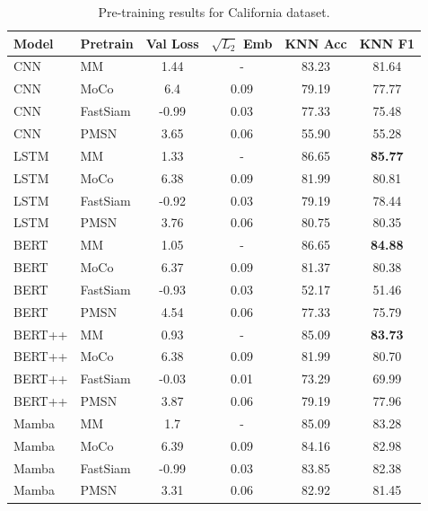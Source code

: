 \begin{table}[ht!]
    \centering
    \caption{Pre-training results for California dataset.}
    \begin{tabular}{llcccc}
        \toprule
        Model & Pretrain & Val Loss & $\sqrt{L_2}$ Emb & KNN Acc & KNN F1 \\
        \midrule
        CNN & MM & 1.44 & - & 83.23 & 81.64 \\
        CNN & MoCo & 6.4 & 0.09 & 79.19 & 77.77 \\
        CNN & FastSiam & -0.99 & 0.03 & 77.33 & 75.48 \\
        CNN & PMSN & 3.65 & 0.06 & 55.90 & 55.28 \\
        LSTM & MM & 1.33 & - & 86.65 & \textbf{85.77} \\
        LSTM & MoCo & 6.38 & 0.09 & 81.99 & 80.81 \\
        LSTM & FastSiam & -0.92 & 0.03 & 79.19 & 78.44 \\
        LSTM & PMSN & 3.76 & 0.06 & 80.75 & 80.35 \\
        BERT & MM & 1.05 & - & 86.65 & \textbf{84.88} \\
        BERT & MoCo & 6.37 & 0.09 & 81.37 & 80.38 \\
        BERT & FastSiam & -0.93 & 0.03 & 52.17 & 51.46 \\
        BERT & PMSN & 4.54 & 0.06 & 77.33 & 75.79 \\
        BERT++ & MM & 0.93 & - & 85.09 & \textbf{83.73} \\
        BERT++ & MoCo & 6.38 & 0.09 & 81.99 & 80.70 \\
        \rowcolor{red!20} BERT++ & FastSiam & -0.03 & 0.01 & 73.29 & 69.99 \\
        BERT++ & PMSN & 3.87 & 0.06 & 79.19 & 77.96 \\
        Mamba & MM & 1.7 & - & 85.09 & 83.28 \\
        Mamba & MoCo & 6.39 & 0.09 & 84.16 & 82.98 \\
        Mamba & FastSiam & -0.99 & 0.03 & 83.85 & 82.38 \\
        Mamba & PMSN & 3.31 & 0.06 & 82.92 & 81.45 \\
        \bottomrule
    \end{tabular}
    \label{tab:pretraining_results_california}
\end{table}

